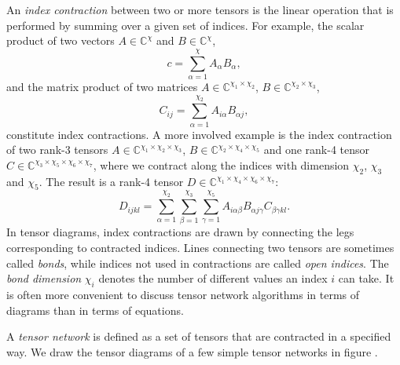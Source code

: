 An \textit{index contraction} between two or more tensors is the linear operation that is performed by summing over a given set of indices. For example, the scalar product of two vectors $A\in\mathbb{C^\chi}$ and $B\in\mathbb{C^\chi}$,
\begin{equation}
	\label{eq:example_tensor_network_scalar_product}
	c = \sum_{\alpha=1}^{\chi}A_\alpha B_\alpha,
\end{equation}
and the matrix product of two matrices $A\in\mathbb{C}^{\chi_1\times\chi_2}$, $B\in\mathbb{C}^{\chi_2\times\chi_3}$,
\begin{equation}
	\label{eq:example_tensor_network_matrix_product}
	C_{ij} = \sum_{\alpha=1}^{\chi_2} A_{i\alpha} B_{\alpha j},
\end{equation}
constitute index contractions. A more involved example is the index contraction of two rank-3 tensors $A\in\mathbb{C}^{\chi_1\times\chi_2\times\chi_3}$, $B\in\mathbb{C}^{\chi_2\times\chi_4\times\chi_5}$ and one rank-4 tensor $C\in\mathbb{C}^{\chi_3\times\chi_5\times\chi_6\times\chi_7}$, where we contract along the indices with dimension $\chi_2$, $\chi_3$ and $\chi_5$. The result is a rank-4 tensor $D\in\mathbb{C}^{\chi_1\times\chi_4\times\chi_6\times\chi_7}$:
\begin{equation}
	\label{eq:example_tensor_network_involved_network}
	D_{ijkl} = \sum_{\alpha=1}^{\chi_2} \sum_{\beta=1}^{\chi_3} \sum_{\gamma=1}^{\chi_5} A_{i \alpha \beta} B_{\alpha j\gamma} C_{\beta \gamma k l}.
\end{equation}
In tensor diagrams, index contractions are drawn by connecting the legs corresponding to contracted indices. Lines connecting two tensors are sometimes called \textit{bonds}, while indices not used in contractions are called \textit{open indices}. The \textit{bond dimension} $\chi_i$ denotes the number of different values an index $i$ can take. It is often more convenient to discuss tensor network algorithms in terms of diagrams than in terms of equations. \par
A \textit{tensor network} is defined as a set of tensors that are contracted in a specified way. We draw the tensor diagrams of a few simple tensor networks in figure .\par
